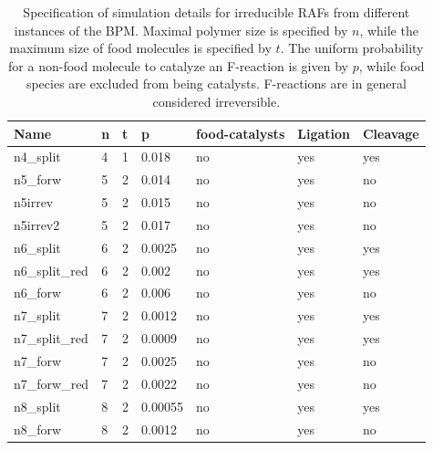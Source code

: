 \documentclass[pdflatex]{sn-jnl}
\theoremstyle{thmstyleone}%
\theoremstyle{examplesty}%
\theoremstyle{thmstylethree}%
\begin{document}
\begin{table}[htb]
	\caption{Specification of simulation details for irreducible RAFs from different instances of the BPM.
	Maximal polymer size is specified by $n$, while the maximum size of food molecules is specified by $t$. The 
	uniform probability for a non-food molecule to catalyze an F-reaction is given by $p$, while food species are excluded 
	from being catalysts. F-reactions are in general considered irreversible.}
	\label{tab:SimulationDetails}
	\begin{tabular}{p{1.5cm}|p{1cm}|p{1.5cm}|p{1.5cm}|p{2.0cm}|p{1.5cm}|p{1cm}}
	Name & n & t & p & food-catalysts & Ligation & Cleavage \\
	\hline 
	n4\_split     		& 	4 	& 	1 	& 	0.018 	& 	no 	& 	yes 		& 	yes 		\\
	n5\_forw   			& 	5  	& 	2 	& 	0.014 	& 	no 	& 	yes 		& 	no 		\\
	n5irrev 			& 	5 	& 	2 	& 	0.015 	& 	no 	& 	yes 		& 	no 		\\
	n5irrev2    		& 	5 	& 	2 	& 	0.017 	& 	no 	& 	yes 		& 	no 		\\
	n6\_split			& 	6 	& 	2 	& 	0.0025	& 	no 	& 	yes 		& 	yes		\\
	n6\_split\_red 		& 	6 	& 	2 	&	0.002	& 	no 	& 	yes 		& 	yes 		\\
	n6\_forw			& 	6 	& 	2	&      0.006	&	no 	& 	yes 		& 	no 		\\
	n7\_split			&      7	&	2	&	0.0012	&	no	& 	yes		& 	yes 		\\
	n7\_split\_red		&	7	&	2	&	0.0009	&	no	&	yes 		& 	yes		\\
	n7\_forw          		&	7	& 	2	&	0.0025	&	no	&	yes 		&	no 		\\
	n7\_forw\_red		&	7	&	2	&	0.0022	&	no	&	yes 		&	no 		\\
	n8\_split			&	8	&	2	&	0.00055	&	no	&	yes 		&	yes 		\\
	n8\_forw			&	8	&	2	&	0.0012	&	no	&	yes 		&	no 		\\
	\end{tabular}
\end{table}
\end{document}
